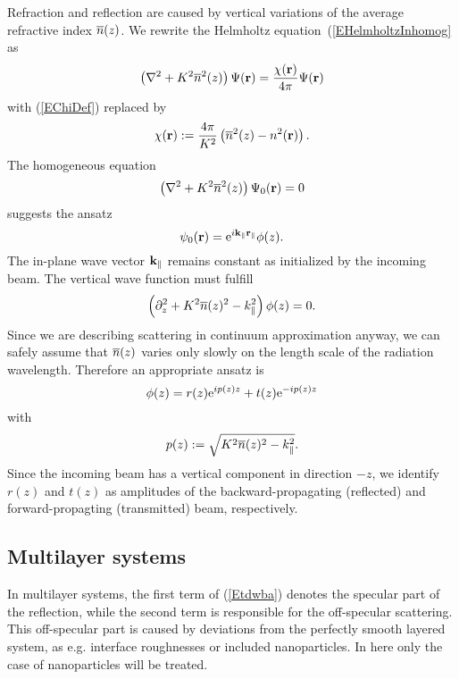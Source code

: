 Refraction and reflection are caused by vertical variations
of the average refractive index $\overline{n}(z)$.
We rewrite the Helmholtz equation~(\ref{EHelmholtzInhomog} as
\begin{equation}\label{EHelmholtzGraded}
  \left(\mathbf{\nabla}^2+K^2\overline{n}^2(z)\right)\Psi(\mathbf{r})
  = \frac{\chi(\mathbf{r})}{4\pi}\Psi(\mathbf{r})
\end{equation}
with (\ref{EChiDef}) replaced by
\begin{equation}\label{EChiGraded}
  \chi(\mathbf{r}) := \frac{4\pi}{K^2}\left(\overline{n}^2(z)-n^2(\mathbf{r})\right).
\end{equation}
The homogeneous equation
\begin{equation}\label{EHelmholtzGradedHomog}
  \left(\mathbf{\nabla}^2+K^2\overline{n}^2(z)\right)\Psi_0(\mathbf{r}) = 0
\end{equation}
suggests the ansatz
\begin{equation}\label{Ewave3}
\psi_0(\mathbf{r}) = {\rm e}^{i \mathbf{k}_\parallel\mathbf{r}_\parallel} \phi(z).
\end{equation}
The in-plane wave vector $\mathbf{k}_\parallel$ remains constant
as initialized by the incoming beam.
The vertical wave function must fulfill
\begin{equation}\label{Ewavez}
\left(\partial_z^2 + K^2\overline{n}(z)^2 - k_\parallel^2 \right) \phi(z) = 0.
\end{equation}
Since we are describing scattering in continuum approximation anyway,
we can safely assume that $\overline{n}(z)$ varies only slowly on the length scale
of the radiation wavelength.
Therefore an appropriate ansatz is
\begin{equation}
  \phi(z) = r(z){\rm e}^{ip(z)z} + t(z){\rm e}^{-ip(z)z}
\end{equation}
with
\begin{equation}
  p(z) := \sqrt{K^2\overline{n}(z)^2 - k_\parallel^2}.
\end{equation}
Since the incoming beam has a vertical component in direction $-z$,
we identify $r(z)$ and $t(z)$
as amplitudes of the backward-propagating (reflected)
and forward-propagting (transmitted) beam, respectively.

\subsection{Multilayer systems}

In multilayer systems, the first term of (\ref{Etdwba}) denotes the specular part of the reflection, while the second term is responsible for the off-specular scattering. This off-specular part is caused by deviations from the perfectly smooth layered system, as e.g. interface roughnesses or included nanoparticles. In here only the case of nanoparticles will be treated.

